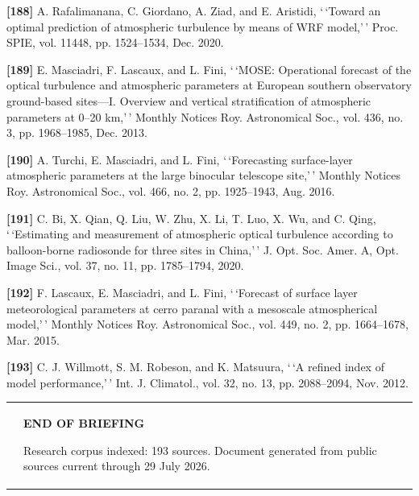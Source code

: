 \documentclass[
]{article}
\begin{document}
\textbf{{[}188{]}} A. Rafalimanana, C. Giordano, A. Ziad, and E.
Aristidi, `\,`Toward an optimal prediction of atmospheric turbulence by
means of WRF model,'\,' Proc. SPIE, vol. 11448, pp. 1524--1534, Dec.
2020.

\textbf{{[}189{]}} E. Masciadri, F. Lascaux, and L. Fini, `\,`MOSE:
Operational forecast of the optical turbulence and atmospheric
parameters at European southern observatory ground-based sites---I.
Overview and vertical stratification of atmospheric parameters at 0--20
km,'\,' Monthly Notices Roy. Astronomical Soc., vol. 436, no. 3, pp.
1968--1985, Dec. 2013.

\textbf{{[}190{]}} A. Turchi, E. Masciadri, and L. Fini, `\,`Forecasting
surface-layer atmospheric parameters at the large binocular telescope
site,'\,' Monthly Notices Roy. Astronomical Soc., vol. 466, no. 2, pp.
1925--1943, Aug. 2016.

\textbf{{[}191{]}} C. Bi, X. Qian, Q. Liu, W. Zhu, X. Li, T. Luo, X. Wu,
and C. Qing, `\,`Estimating and measurement of atmospheric optical
turbulence according to balloon-borne radiosonde for three sites in
China,'\,' J. Opt. Soc. Amer. A, Opt. Image Sci., vol. 37, no. 11, pp.
1785--1794, 2020.

\textbf{{[}192{]}} F. Lascaux, E. Masciadri, and L. Fini, `\,`Forecast
of surface layer meteorological parameters at cerro paranal with a
mesoscale atmospherical model,'\,' Monthly Notices Roy. Astronomical
Soc., vol. 449, no. 2, pp. 1664--1678, Mar. 2015.

\textbf{{[}193{]}} C. J. Willmott, S. M. Robeson, and K. Matsuura, `\,`A
refined index of model performance,'\,' Int. J. Climatol., vol. 32, no.
13, pp. 2088--2094, Nov. 2012.

\begin{longtable}[]{@{}
  >{\raggedright\arraybackslash}p{}
  >{\raggedright\arraybackslash}p{}@{}}
\toprule\noalign{}
\endhead
\bottomrule\noalign{}
\endlastfoot
& \textbf{END OF BRIEFING}

Research corpus indexed: 193 sources. Document generated from public
sources current through 29 July 2026. \\
\end{longtable}
\end{document}
